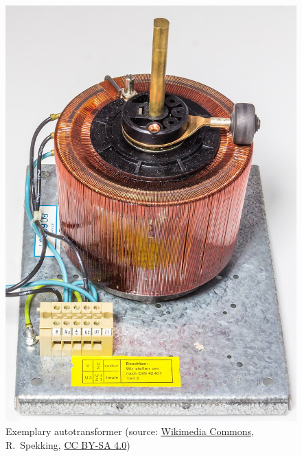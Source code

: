 \begin{frame}
\begin{columns}
\begin{column}{0.425\textwidth}
\begin{figure}
				\includegraphics[height=0.6\textheight]{fig/lec04/Variable_autotransformer.jpg}
				\caption{Exemplary autotransformer (source: \href{https://de.wikipedia.org/wiki/Datei:Variable_autotransformer_0-220_V,_4_A,_880_VA-1095.jpg}{Wikimedia Commons}, R.~Spekking, \href{https://creativecommons.org/licenses/by-sa/4.0/deed.en}{CC BY-SA 4.0})}
			\end{figure}
		\end{column}
		\end{columns}
\end{frame}

